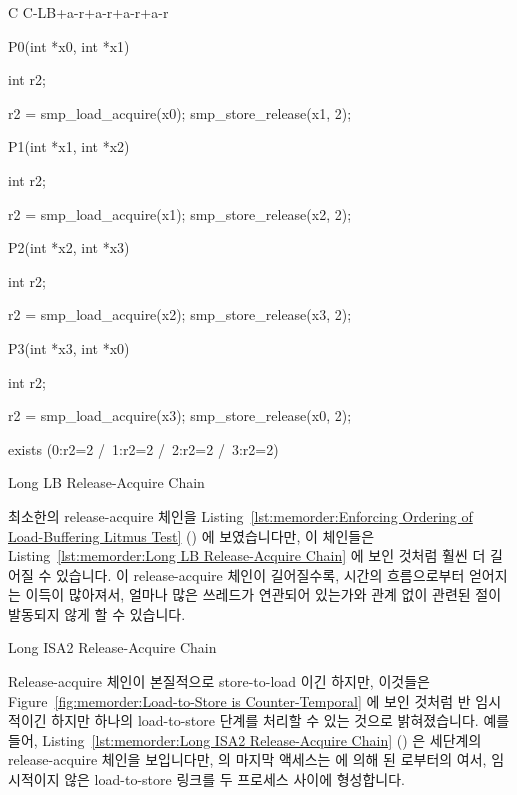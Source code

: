 \begin{listing}[tbp]
{ \scriptsize
\begin{verbbox}[\LstLineNo]
C C-LB+a-r+a-r+a-r+a-r
{
}

P0(int *x0, int *x1)
{
  int r2;

  r2 = smp_load_acquire(x0);
  smp_store_release(x1, 2);
}


P1(int *x1, int *x2)
{
  int r2;

  r2 = smp_load_acquire(x1);
  smp_store_release(x2, 2);
}

P2(int *x2, int *x3)
{
  int r2;

  r2 = smp_load_acquire(x2);
  smp_store_release(x3, 2);
}

P3(int *x3, int *x0)
{
  int r2;

  r2 = smp_load_acquire(x3);
  smp_store_release(x0, 2);
}

exists (0:r2=2 /\ 1:r2=2 /\ 2:r2=2 /\ 3:r2=2)
\end{verbbox}
}
\centering
\theverbbox
\caption{Long LB Release-Acquire Chain}
\label{lst:memorder:Long LB Release-Acquire Chain}
\end{listing}

최소한의 release-acquire 체인을
Listing~\ref{lst:memorder:Enforcing Ordering of Load-Buffering Litmus Test}
()
에 보였습니다만, 이 체인들은
Listing~\ref{lst:memorder:Long LB Release-Acquire Chain}
에 보인 것처럼 훨씬 더 길어질 수 있습니다.
이 release-acquire 체인이 길어질수록, 시간의 흐름으로부터 얻어지는 이득이
많아져서, 얼마나 많은 쓰레드가 연관되어 있는가와 관계 없이 관련된 
절이 발동되지 않게 할 수 있습니다.

\begin{listing}[tbp]

\caption{Long ISA2 Release-Acquire Chain}
\label{lst:memorder:Long ISA2 Release-Acquire Chain}
\end{listing}

Release-acquire 체인이 본질적으로 store-to-load 이긴 하지만, 이것들은
Figure~\ref{fig:memorder:Load-to-Store is Counter-Temporal}
에 보인 것처럼 반 임시적이긴 하지만 하나의 load-to-store 단계를 처리할 수 있는
것으로 밝혀졌습니다.
예를 들어,
Listing~\ref{lst:memorder:Long ISA2 Release-Acquire Chain}
()
은 세단계의 release-acquire 체인을 보입니다만,  의 마지막 액세스는
 에 의해  된  로부터의  여서,
임시적이지 않은 load-to-store 링크를 두 프로세스 사이에 형성합니다.
\iffalse

